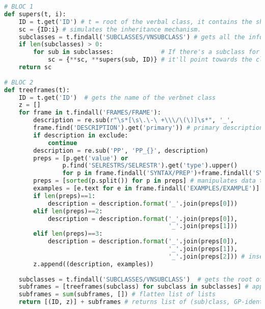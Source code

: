 \begin{lstlisting}[language=Python, caption = Importation de l'architecture des classes verbales, label=fig:archivn]
# BLOC 1
def supers(t, i):
    ID = t.get('ID') # t = root of the verbal class, it contains the shared syntactic information.
    sc = {ID:i} # simulates the inheritance mechanism.
    subclasses = t.findall('SUBCLASSES/VNSUBCLASS') # gets all the information on the subclasses.
    if len(subclasses) > 0:
        for sub in subclasses:             # If there's a subclass for a given VNCLASS, 
            sc = {**sc, **supers(sub, ID)} # it'll point towards the class it's being dominated by.
    return sc
		
# BLOC 2
def treeframes(t):
    ID = t.get('ID')  # gets the name of the verbnet class
    z = []            
    for frame in t.findall('FRAMES/FRAME'):
        description = re.sub(r"\s*[\s\.\-\ +\\\/\(\)]\s*", '_',  
        frame.find('DESCRIPTION').get('primary')) # primary description = identification of a GP
        if description in exclude:
            continue
        description = re.sub('PP', 'PP_{}', description) 
        preps = [p.get('value') or 
                p.find('SELRESTRS/SELRESTR').get('type').upper()                  
                for p in frame.findall('SYNTAX/PREP')+frame.findall('SYNTAX/LEX')] 
        preps = [sorted(p.split()) for p in preps] # manipulates data to insert the prep. in desc.                                
        examples = [e.text for e in frame.findall('EXAMPLES/EXAMPLE')] # get ex. for each desc.
        if len(preps)==1:
            description = description.format('_'.join(preps[0]))
        elif len(preps)==2:
            description = description.format('_'.join(preps[0]),
                                             '_'.join(preps[1]))
        elif len(preps)==3:
            description = description.format('_'.join(preps[0]), 
                                             '_'.join(preps[1]), 
                                             '_'.join(preps[2])) # inserting preps in descriptions
        z.append((description, examples))
        
    subclasses = t.findall('SUBCLASSES/VNSUBCLASS')  # gets the root of each subclasses
    subframes = [treeframes(subclass) for subclass in subclasses] # applies function to subclasses
    subframes = sum(subframes, []) # flatten list of lists
    return [(ID, z)] + subframes # returns list of (sub)class, GP-identification and example
		

\end{lstlisting}
